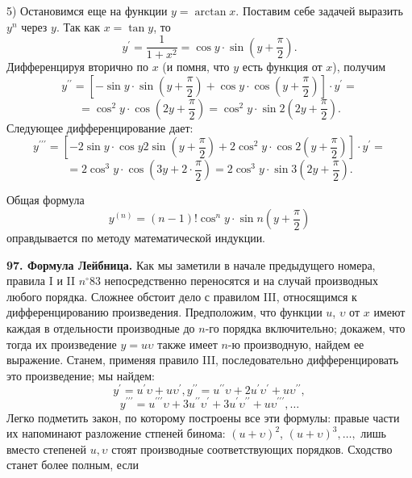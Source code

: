 \documentclass[a5paper]{book}
\begin{document}
5) Остановимся еще на функции $y=\arctan{x}$. Поставим себе задачей выразить $y^{n}$ через $y$. Так как $x=\tan{y}$, то
$$
y^{\prime}=\dfrac{1}{1+x^2}=\cos{y}\cdot\sin{(y+\frac{\pi}{2})}.
$$
\noindent Дифференцируя вторично по $x$ (и помня, что $y$ есть функция от $x$), получим
$$
y^{\prime\prime}=\left[ {-\sin{y}\cdot\sin(y+\frac{\pi}{2})+\cos{y}\cdot\cos{(y+\frac{\pi}{2})}} \right]\cdot y^{\prime}=
$$
$$=\cos^2{y}\cdot\cos{(2y+\frac{\pi}{2})}=\cos^2{y}\cdot\sin 2(2y+\frac{\pi}{2}).
$$
\noindent Следующее дифференцирование дает:
$$
y^{\prime\prime\prime}=\left[ {-2\sin{y}\cdot\cos{y}2\sin(y+\frac{\pi}{2})+2\cos^2{y}\cdot\cos 2(y+\frac{\pi}{2})} \right]\cdot y^{\prime}=
$$
$$
=2\cos^3{y}\cdot\cos{(3y+2\cdot\frac{\pi}{2})}=2\cos^3{y}\cdot\sin 3(2y+\frac{\pi}{2}).
$$

Общая формула
$$
y^{(n)}=(n-1)!\cos^{n}y\cdot\sin n(y+\frac{\pi}{2})
$$
\noindent оправдывается по методу математической индукции.

\textbf{97. Формула Лейбница.} Как мы заметили в начале предыдущего номера, правила I и II $n^{\circ}83$ непосредственно переносятся и на случай производных любого порядка. Сложнее обстоит дело с правилом III, относящимся к дифференцированию произведения.
Предположим, что функции $u$, $\upsilon$ от $x$ имеют каждая в отдельности производные до $n$-го порядка включительно; докажем, что тогда их произведение $y=u\upsilon$ также имеет $n$-ю производную, найдем ее выражение.
Станем, применяя правило III, последовательно дифференцировать это произведение; мы найдем:
$$
y^{\prime}=u^{\prime}\upsilon + u\upsilon^{\prime},{  } 
  y^{\prime\prime}=u^{\prime\prime}\upsilon +2u^{\prime}\upsilon^{\prime}+u\upsilon^{\prime\prime},
$$
$$
y^{\prime\prime\prime}=u^{\prime\prime\prime}\upsilon +3u^{\prime\prime}\upsilon^{\prime}+3u^{\prime}\upsilon^{\prime\prime}+u\upsilon^{\prime\prime\prime},\ldots
$$
Легко подметить закон, по которому построены все эти формулы: правые части их напоминают разложение стпеней бинома: $(u+\upsilon)^{2}$, $(u+\upsilon)^{3},\ldots,$ лишь вместо степеней $u, \upsilon$ стоят производные соответствующих порядков. Сходство станет более полным, если
\end{document}

